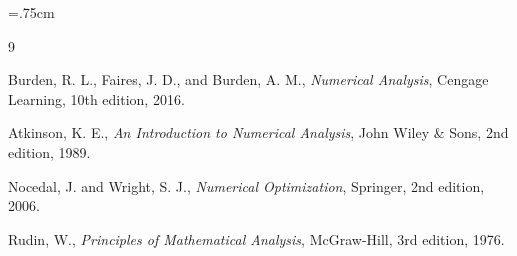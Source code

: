 \documentclass[oneside,bsc,12pt]{AUTthesis}
\begin{document}
\baselineskip=.75cm
\linespread{1.65}






\pagestyle{style1}



\chapterfont{\vspace*{-2em}\centering\LARGE}%
\begin{thebibliography}{9}
\begin{latin}
Burden, R. L., Faires, J. D., and Burden, A. M., \textit{Numerical Analysis}, Cengage Learning, 10th edition, 2016.
\end{latin}

\begin{latin}
Atkinson, K. E., \textit{An Introduction to Numerical Analysis}, John Wiley \& Sons, 2nd edition, 1989.
\end{latin}

\begin{latin}
Nocedal, J. and Wright, S. J., \textit{Numerical Optimization}, Springer, 2nd edition, 2006.
\end{latin}

\begin{latin}
Rudin, W., \textit{Principles of Mathematical Analysis}, McGraw-Hill, 3rd edition, 1976.
\end{latin}
\end{thebibliography}

\end{document}
